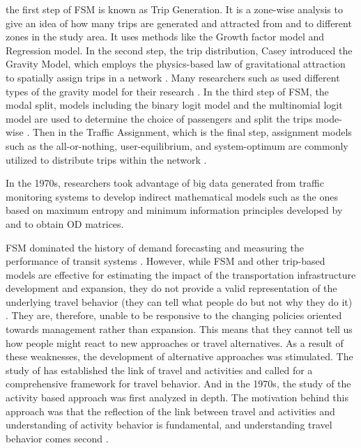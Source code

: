 \documentclass[11pt,twoside]{article}
\numberwithin{equation}{section}
\newcommand{\?}{\stackrel{?}{=}}
\begin{document}
the first step of FSM is known as Trip Generation. It is a zone-wise analysis to give an idea of how many trips are generated and attracted from and to different zones in the study area. It uses methods like the Growth factor model and Regression model. In the second step, the trip distribution, Casey introduced the Gravity Model, which employs the physics-based law of gravitational attraction to spatially assign trips in a network \citep{willumsenEstimationODMatrix1978, ekowicaksonoEstimatingOriginDestinationMatrix2016}. Many researchers such as \citet{hogbergEstimationParametersModels1976, robillardEstimatingODMatrix1975, lowNEWAPPROACHTRANSPORTATION1972} used different types of the gravity model for their research \citep{willumsenEstimationODMatrix1978}.  In the third step of FSM, the modal split, models including the binary logit model and the multinomial logit model are used to determine the choice of passengers and split the trips mode-wise . Then in the Traffic Assignment, which is the final step, assignment models such as the all-or-nothing, user-equilibrium, and system-optimum are commonly utilized to distribute trips within the network \citep{TripAssignment}.

In the 1970s, researchers took advantage of big data generated from traffic monitoring systems to develop indirect mathematical models such as the ones based on maximum entropy and minimum information principles developed by \citet{vanzuylenMostLikelyTrip1980} and \citet{willumsenEstimationODMatrix1978} to obtain OD matrices.  

FSM dominated the history of demand forecasting and measuring the performance of transit systems \citep{mcnallyFourStepModel2000}. However, while FSM and other trip-based models are effective for estimating the impact of the transportation infrastructure development and expansion, they do not provide a valid representation of the underlying travel behavior (they can tell what people do but not why they do it) \citep{mcnallyActivityBasedApproach2007}. They are, therefore, unable to be responsive to the changing policies oriented towards management rather than expansion. This means that they cannot tell us how people might react to new approaches or travel alternatives. As a result of these weaknesses, the development of alternative approaches was stimulated. The study of \citet{mitchellUrbanTrafficFunction1954} has established the link of travel and activities and called for a comprehensive framework for travel behavior. And in the 1970s, the study of the activity based approach was first analyzed in depth. The motivation behind this approach was that the reflection of the link between travel and activities and understanding of activity behavior is fundamental, and understanding travel behavior comes second \citep{mcnallyActivityBasedApproach2007}.
\end{document}
